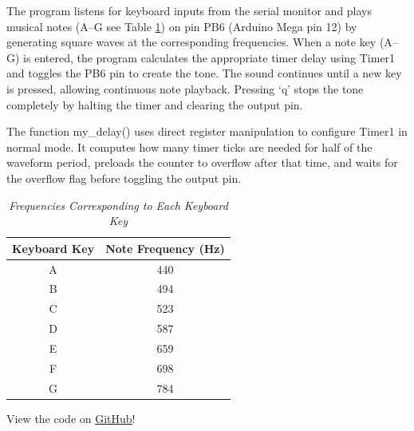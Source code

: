 \documentclass{article}
\begin{document}
The program listens for keyboard inputs from the serial monitor and plays musical notes (A–G see Table \ref{tab:frequencies}) on pin PB6 (Arduino Mega pin 12) by generating square waves at the corresponding frequencies. When a note key (A–G) is entered, the program calculates the appropriate timer delay using Timer1 and toggles the PB6 pin to create the tone. The sound continues until a new key is pressed, allowing continuous note playback. Pressing ‘q’ stops the tone completely by halting the timer and clearing the output pin.

The function my\_delay() uses direct register manipulation to configure Timer1 in normal mode. It computes how many timer ticks are needed for half of the waveform period, preloads the counter to overflow after that time, and waits for the overflow flag before toggling the output pin.

\begin{table}[ht]
\begin{center}
\caption{\textit{Frequencies Corresponding to Each Keyboard Key}}
\label{tab:frequencies}
\begin{tabular}{cc}
    \hline
    \textbf{Keyboard Key} & \textbf{Note Frequency (Hz)} \\
    \hline
    A & 440 \\
    B & 494 \\
    C & 523 \\
    D & 587 \\
    E & 659 \\
    F & 698 \\
    G & 784 \\
    \hline
\end{tabular}
\end{center}
\end{table}

 
View the code on \href{https://github.com/jrkre/cpe-301}{GitHub}!
\end{document}
